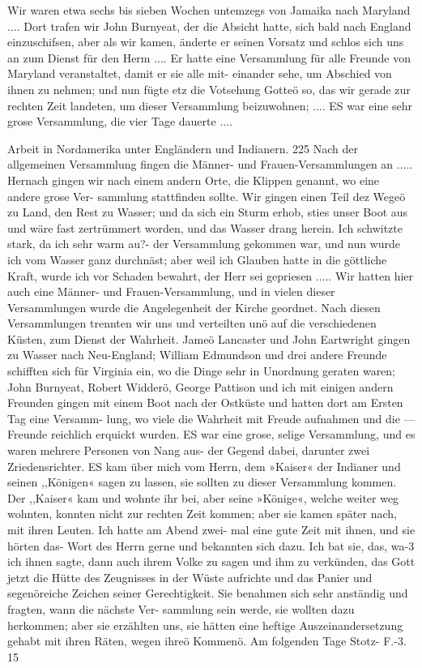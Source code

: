 Wir waren etwa sechs bis sieben Wochen untemzegs von
Jamaika nach Maryland .... Dort trafen wir John Burnyeat,
der die Absicht hatte, sich bald nach England einzuschifsen, aber
als wir kamen, änderte er seinen Vorsatz und schlos sich uns an
zum Dienst für den Herm .... Er hatte eine Versammlung für
alle Freunde von Maryland veranstaltet, damit er sie alle mit-
einander sehe, um Abschied von ihnen zu nehmen; und nun
fügte etz die Votsehung Gotteö so, das wir gerade zur rechten
Zeit landeten, um dieser Versammlung beizuwohnen; .... ES
war eine sehr grose Versammlung, die vier Tage dauerte ....


Arbeit in Nordamerika unter Engländern und Indianern. 225
Nach der allgemeinen Versammlung fingen die Männer- und
Frauen-Versammlungen an ..... Hernach gingen wir nach einem
andern Orte, die Klippen genannt, wo eine andere grose Ver-
sammlung stattfinden sollte. Wir gingen einen Teil dez Wegeö
zu Land, den Rest zu Wasser; und da sich ein Sturm erhob, sties
unser Boot aus und wäre fast zertrümmert worden, und das
Wasser drang herein. Ich schwitzte stark, da ich sehr warm au?-
der Versammlung gekommen war, und nun wurde ich vom Wasser
ganz durchnäst; aber weil ich Glauben hatte in die göttliche Kraft,
wurde ich vor Schaden bewahrt, der Herr sei gepriesen .....
Wir hatten hier auch eine Männer- und Frauen-Versammlung,
und in vielen dieser Versammlungen wurde die Angelegenheit der
Kirche geordnet.
Nach diesen Versammlungen trennten wir uns und verteilten
unö auf die verschiedenen Küsten, zum Dienst der Wahrheit.
Jameö Lancaster und John Eartwright gingen zu Wasser nach
Neu-England; William Edmundson und drei andere Freunde
schifften sich für Virginia ein, wo die Dinge sehr in Unordnung
geraten waren; John Burnyeat, Robert Widderö, George Pattison
und ich mit einigen andern Freunden gingen mit einem Boot
nach der Ostküste und hatten dort am Ersten Tag eine Versamm-
lung, wo viele die Wahrheit mit Freude aufnahmen und die —
Freunde reichlich erquickt wurden. ES war eine grose, selige
Versammlung, und es waren mehrere Personen von Nang aus-
der Gegend dabei, darunter zwei Zriedensrichter. ES kam über
mich vom Herrn, dem »Kaiser« der Indianer und seinen ,,Königen«
sagen zu lassen, sie sollten zu dieser Versammlung kommen. Der
,,Kaiser« kam und wohnte ihr bei, aber seine »Könige«, welche weiter
weg wohnten, konnten nicht zur rechten Zeit kommen; aber sie
kamen später nach, mit ihren Leuten. Ich hatte am Abend zwei-
mal eine gute Zeit mit ihnen, und sie hörten das- Wort des Herrn
gerne und bekannten sich dazu. Ich bat sie, das, wa-3 ich ihnen
sagte, dann auch ihrem Volke zu sagen und ihm zu verkünden,
das Gott jetzt die Hütte des Zeugnisses in der Wüste aufrichte
und das Panier und segenöreiche Zeichen seiner Gerechtigkeit. Sie
benahmen sich sehr anständig und fragten, wann die nächste Ver-
sammlung sein werde, sie wollten dazu herkommen; aber sie
erzählten uns, sie hätten eine heftige Auszeinandersetzung gehabt
mit ihren Räten, wegen ihreö Kommenö. Am folgenden Tage
Stotz- F.-3. 15


